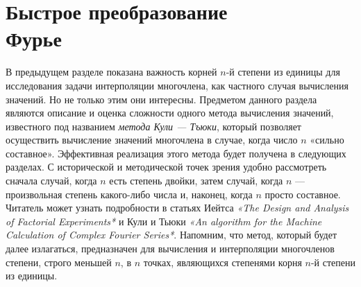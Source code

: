 \documentclass{mai_book}
\begin{document}
\chapter{ Быстрое преобразование\\ Фурье}
В предыдущем разделе показана важность корней $n$-й степени из 
единицы для исследования задачи интерполяции многочлена, как частного
случая вычисления значений. Но не только этим они интересны. 
Предметом данного раздела являются описание и оценка сложности одного
метода вычисления значений, известного под названием \textit{метода Кули
— Тъюки}, который позволяет осуществить вычисление значений 
многочлена в случае, когда число $n$ «сильно составное». Эффективная 
реализация этого метода будет получена в следующих разделах. С 
исторической и методической точек зрения удобно рассмотреть сначала случай,
когда $n$ есть степень двойки, затем случай, когда $n$ — произвольная 
степень какого-либо числа и, наконец, когда $n$ просто составное. Читатель
может узнать подробности в статьях Иейтса \textit{«The Design and Analysis
of Factorial Experiments*} и Кули и Тьюки \textit{«An algorithm for the Machine
Calculation of Complex Fourier Series*}. Напомним, что метод, который
будет далее излагаться, предназначен для вычисления и интерполяции
многочленов степени, строго меньшей $n$, в $n$ точках, являющихся 
степенями корня $n$-й степени из единицы.
\end{document}
